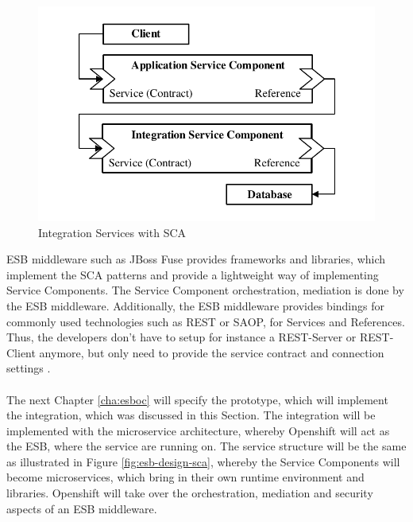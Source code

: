 \begin{figure}[htbp]
	\centering
	\includegraphics[scale=1]{images/esb-sca-example.pdf}
	\caption{Integration Services with SCA}
	\label{fig:esb-design-sca}
\end{figure}
  
ESB middleware such as JBoss Fuse provides frameworks and libraries, which implement the SCA patterns and provide a lightweight way of implementing Service Components. The Service Component orchestration, mediation is done by the ESB middleware. Additionally, the ESB middleware provides bindings for commonly used technologies such as REST or SAOP, for Services and References. Thus, the developers don't have to setup for instance a REST-Server or REST-Client anymore, but only need to provide the service contract and connection settings \cite{MicroSoa2008, Richards2015}.
\\ \\
The next Chapter \vref{cha:esboc} will specify the prototype, which will implement the integration, which was discussed in this Section. The integration will be implemented with the microservice architecture, whereby Openshift will act as the ESB, where the service are running on. The service structure will be the same as illustrated in Figure \vref{fig:esb-design-sca}, whereby the Service Components will become microservices, which bring in their own runtime environment and libraries. Openshift will take over the orchestration, mediation and security aspects of an ESB middleware.